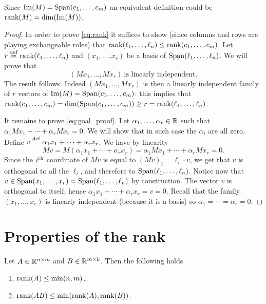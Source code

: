 \documentclass[11pt,nocut]{article}
\begin{document}
Since ${{\rm Im}}(M) = {{\rm Span}}(c_1, \dots, c_m)$ an equivalent definition could be ${{\rm rank}}(M) = {{\rm dim}}({{\rm Im}}(M))$.
\\

\begin{proof}
	In order to prove \eqref{eq:rank} it suffices to show (since columns and rows are playing exchangeable roles) that ${{\rm rank}}(\ell_1, \dots, \ell_n) \leq {{\rm rank}}(c_1, \dots, c_m)$.
	Let $r \overset{\rm def}{=} {{\rm rank}}(\ell_1, \dots, \ell_n)$ and $(x_1, \dots, x_r)$ be a basis of ${{\rm Span}}(\ell_1, \dots, \ell_n)$. We will prove that
	\begin{equation}\label{eq:goal_proof}
	(M x_1, \dots, M x_r) \ \text{is linearly independent}.
	\end{equation}
	The result follows. Indeed $(M x_1, \dots, M x_r)$ is then a linearly independent family of $r$ vectors of ${{\rm Im}}(M) = {{\rm Span}}(c_1, \dots, c_m)$: this implies that ${{\rm rank}}(c_1, \dots, c_m) = {{\rm dim}}({{\rm Span}}(c_1, \dots, c_m)) \geq r = {{\rm rank}}(\ell_1, \dots, \ell_n)$.

	It remains to prove \eqref{eq:goal_proof}. Let $\alpha_1, \dots, \alpha_r \in \mathbb{R}$ such that $\alpha_1 M x_1 + \cdots + \alpha_r M x_r = 0$. We will show that in such case the $\alpha_i$ are all zero. Define $v \overset{\rm def}{=} \alpha_1 x_1 + \cdots + \alpha_r x_r$. We have by linearity
	$$
	M v = M (\alpha_1 x_1 + \cdots + \alpha_r x_r) = \alpha_1 M x_1 + \cdots + \alpha_r M x_r = 0.
	$$
	Since the $i^{\rm th}$ coordinate of $Mv$ is equal to $(Mv)_i = \ell_i \cdot v$, we get that $v$ is orthogonal to all the $\ell_i$, and therefore to ${{\rm Span}}(\ell_1, \dots, \ell_n)$. Notice now that $v \in {{\rm Span}}(x_1, \dots, x_r) = {{\rm Span}}(\ell_1, \dots, \ell_n)$ by construction. The vector $v$ is orthogonal to itself, hence $\alpha_1 x_1 + \cdots + \alpha_r x_r = v= 0$. Recall that the family $(x_1, \dots, x_r)$ is linearly independent (because it is a basis) so $\alpha_1 = \cdots = \alpha_r = 0$.
\end{proof}

\section{Properties of the rank}

\begin{proposition}
	Let $A \in \mathbb{R}^{n \times m}$ and $B \in \mathbb{R}^{m \times k}$. Then the following holds
	\begin{enumerate}[label=(\roman*)]
		\item ${{\rm rank}}(A) \leq \min(n,m)$.
		\item ${{\rm rank}}(AB) \leq \min({{\rm rank}}(A),{{\rm rank}}(B))$.
	\end{enumerate}
\end{proposition}
\end{document}
